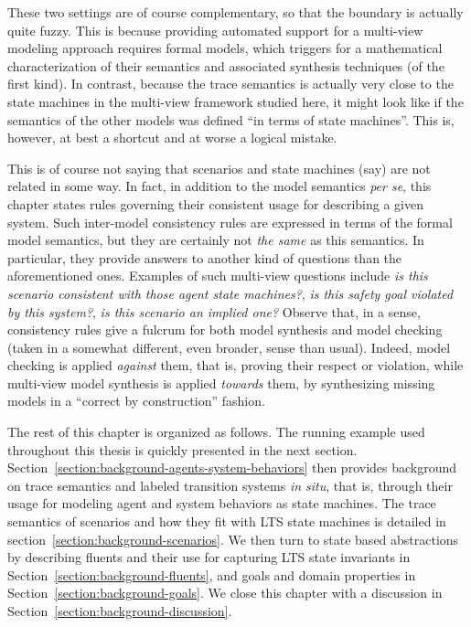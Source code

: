 These two settings are of course complementary, so that the boundary is actually quite fuzzy. This is because providing automated support for a multi-view modeling approach requires formal models, which triggers for a mathematical characterization of their semantics and associated synthesis techniques (of the first kind). In contrast, because the trace semantics is actually very close to the state machines in the multi-view framework studied here, it might look like if the semantics of the other models was defined ``in terms of state machines''. This is, however, at best a shortcut and at worse a logical mistake.

This is of course not saying that scenarios and state machines (say) are not related in some way. In fact, in addition to the model semantics \emph{per se}, this chapter states rules governing their consistent usage for describing a given system. Such inter-model consistency rules are expressed in terms of the formal model semantics, but they are certainly not \emph{the same} as this semantics. In particular, they provide answers to another kind of questions than the aforementioned ones. Examples of such multi-view questions include \emph{is this scenario consistent with those agent state machines?}, \emph{is this safety goal violated by this system?}, \emph{is this scenario an implied one?} Observe that, in a sense, consistency rules give a fulcrum for both model synthesis and model checking (taken in a somewhat different, even broader, sense than usual). Indeed, model checking is applied \emph{against} them, that is, proving their respect or violation, while multi-view model synthesis is applied \emph{towards} them, by synthesizing missing models in a ``correct by construction'' fashion.

The rest of this chapter is organized as follows. The running example used throughout this thesis is quickly presented in the next section. Section~\ref{section:background-agents-system-behaviors} then provides background on trace semantics and labeled transition systems \emph{in situ}, that is, through their usage for modeling agent and system behaviors as state machines. The trace semantics of scenarios and how they fit with LTS state machines is detailed in section~\ref{section:background-scenarios}. We then turn to state based abstractions by describing fluents and their use for capturing LTS state invariants in Section~\ref{section:background-fluents}, and goals and domain properties in Section~\ref{section:background-goals}. We close this chapter with a discussion in Section~\ref{section:background-discussion}. 








